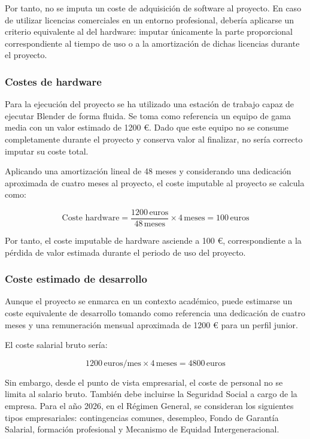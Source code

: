 Por tanto, no se imputa un coste de adquisición de software al proyecto. En caso de utilizar licencias comerciales en un entorno profesional, debería aplicarse un criterio equivalente al del hardware: imputar únicamente la parte proporcional correspondiente al tiempo de uso o a la amortización de dichas licencias durante el proyecto.

\subsubsection{Costes de hardware}
\label{subsubsec:a-costes-hardware}

Para la ejecución del proyecto se ha utilizado una estación de trabajo capaz de ejecutar Blender de forma fluida. Se toma como referencia un equipo de gama media con un valor estimado de 1200 €. Dado que este equipo no se consume completamente durante el proyecto y conserva valor al finalizar, no sería correcto imputar su coste total.

Aplicando una amortización lineal de 48 meses y considerando una dedicación aproximada de cuatro meses al proyecto, el coste imputable al proyecto se calcula como:

\[
\text{Coste hardware} =
\frac{1200\,\text{euros}}{48\,\text{meses}}
\times 4\,\text{meses}
= 100\,\text{euros}
\]

Por tanto, el coste imputable de hardware asciende a 100 €, correspondiente a la pérdida de valor estimada durante el periodo de uso del proyecto.

\subsubsection{Coste estimado de desarrollo}
\label{subsubsec:a-costes-desarrollo}

Aunque el proyecto se enmarca en un contexto académico, puede estimarse un coste equivalente de desarrollo tomando como referencia una dedicación de cuatro meses y una remuneración mensual aproximada de 1200 € para un perfil junior.

El coste salarial bruto sería:

\[
1200\,\text{euros/mes} \times 4\,\text{meses}
= 4800\,\text{euros}
\]

Sin embargo, desde el punto de vista empresarial, el coste de personal no se limita al salario bruto. También debe incluirse la Seguridad Social a cargo de la empresa. Para el año 2026, en el Régimen General, se consideran los siguientes tipos empresariales: contingencias comunes, desempleo, Fondo de Garantía Salarial, formación profesional y Mecanismo de Equidad Intergeneracional.

